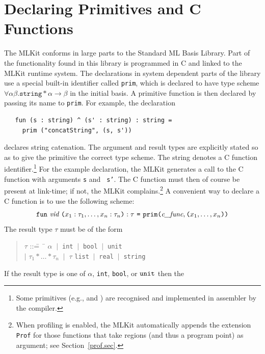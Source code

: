 \documentclass[12pt]{book}
\begin{document}
\section{Declaring Primitives and C Functions}
\label{parPassing.sec}
The MLKit conforms in large parts to the Standard ML Basis Library. Part
of the functionality found in this library is programmed in C and
linked to the MLKit runtime system.  The declarations in system
dependent parts of the library use a special built-in identifier
called \texttt{prim}, which is declared to have type
scheme $\forall \alpha \beta .  \texttt{string} 
\ast \alpha \rightarrow \beta$ in the initial basis.  A primitive
function is then declared by passing its name to \texttt{prim}.  For
example, the declaration
\begin{verbatim}
   fun (s : string) ^ (s' : string) : string = 
     prim ("concatString", (s, s'))
\end{verbatim}
declares string catenation.  The argument and result types are
explicitly stated so as to give the primitive the correct type scheme.
The string  denotes a C function
identifier.\footnote{Some primitives (e.g.,  and
  ) are recognised and implemented in assembler by the
  compiler.} For the example declaration, the MLKit generates a call to
the C function  with arguments {\tt s} and {\tt
  s'}. The C function must then of course be present at link-time; if
not, the MLKit complains.\footnote{When profiling is enabled, the MLKit
  automatically appends the extension \texttt{Prof} for those
  functions that take regions (and thus a program point) as argument;
  see Section~\ref{prof.sec}.}%
A convenient way to declare a C function is to use the following
scheme:
$$\texttt{fun}~ \emph{vid} ~\texttt{(}x_1:\tau_1, \ldots, x_n:\tau_n\texttt{)}
    : \tau ~\texttt{=} ~\texttt{prim(}\emph{c\_func}, \texttt{(}
  x_1, \ldots, x_n\texttt{)} \texttt{)}
$$
The result type $\tau$ must be of the form
\begin{quote}
\begin{tabbing}
$\tau$ ::\== ~\= $\alpha$ $~|~$ {\tt int} $~|~$ {\tt bool} $~|~$ {\tt unit} \\ 
  \> $|$ \> $\tau_1 \ast \ldots \ast \tau_n$ $~|~$ $\tau$ {\tt list} $~|~$ {\tt real} $~|~$ {\tt string} 
\end{tabbing}
\end{quote}
\noindent
If the result type is one of $\alpha$, {\tt int}, {\tt bool}, or ${\tt unit}$ then the
\end{document}
